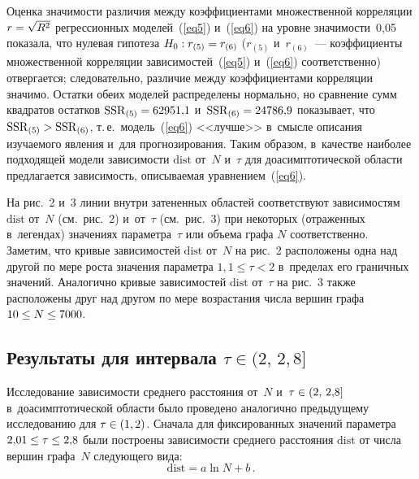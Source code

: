 \begin{multicols}{2}
Оценка значимости различия между коэффициентами множественной корреляции $r\hm=\sqrt{R^2}$ регрессионных моделей~(\ref{eq5}) и~(\ref{eq6})
 на уровне зна\-чи\-мости~0,05 показала, что нулевая гипотеза $H_0:\linebreak r_{(5)}\hm=r_{(6)}$
($r_{(5)}$ и~$r_{(6)}$~--- коэффициенты множественной корреляции зависимостей~(\ref{eq5}) и~(\ref{eq6})
соответственно) отвергается; следовательно, различие между коэффициентами корреляции значимо.
Остатки обеих моделей распределены нормально, но сравнение сумм квад\-ра\-тов
остатков $\mathrm{SSR}_{(5)}\hm=62951{,}1$ и~$\mathrm{SSR}_{(6)}\hm=24786{,}9$ показывает, что $\mathrm{SSR}_{(5)}\hm>\mathrm{SSR}_{(6)}$, т.\,е.\ модель~(\ref{eq6}) 
<<лучше>> в~смыс\-ле описания изуча\-емо\-го явления и~для прогнозирования.
Таким образом, в~качестве наиболее под\-хо\-дя\-щей модели за\-ви\-си\-мости $\mathrm{dist}$ от~$N$ и~$\tau$ для до\-асимп\-то\-ти\-че\-ской
об\-ласти предлагается за\-ви\-си\-мость, описываемая уравнением~(\ref{eq6}).



На рис.~2 и~3 линии внут\-ри затененных областей соответствуют зависимостям $\mathrm{dist}$ от~$N$ (см.\ рис.~2)
и~от~$\tau$ (см.\ рис.~3) при некоторых (отраженных в~легендах) значениях па\-ра\-мет\-ра~$\tau$
или объема графа $N$ соответственно. Заметим, что кривые зависимостей $\mathrm{dist}$ от~$N$ на рис.~2
расположены одна над другой по мере роста значения параметра $1,1\leq\tau<2$ в~пределах его граничных значений.
Аналогично кривые зависимостей $\mathrm{dist}$ от~$\tau$ на рис.~3 также расположены друг над другом по
мере воз\-рас\-та\-ния чис\-ла вершин графа $10\hm\leq N\hm\leq 7000$.


\vspace*{-6pt}

\subsection{Результаты для интервала $\tau\in(2,\,2{,}8]$}

\vspace*{-2pt}


Исследование зависимости сред\-не\-го рас\-сто\-яния от~$N$ и~$\tau\hm\in(2,\,2{,}8]$ в~до\-асимп\-то\-ти\-че\-ской об\-ласти
было проведено аналогично предыду\-ще\-му исследованию для $\tau\hm\in(1,2)$.
Сначала для фиксированных значений па\-ра\-мет\-ра $2{,}01\hm\leq\tau\hm\leq 2{,}8$ были построены зависимости сред\-не\-го
рас\-сто\-яния $\mathrm{dist}$ от чис\-ла вершин графа~$N$ сле\-ду\-юще\-го вида:
\begin{equation}
\label{eq7}
\mathrm{dist} = a \ln N + b\,.
\end{equation}


\end{multicols}
